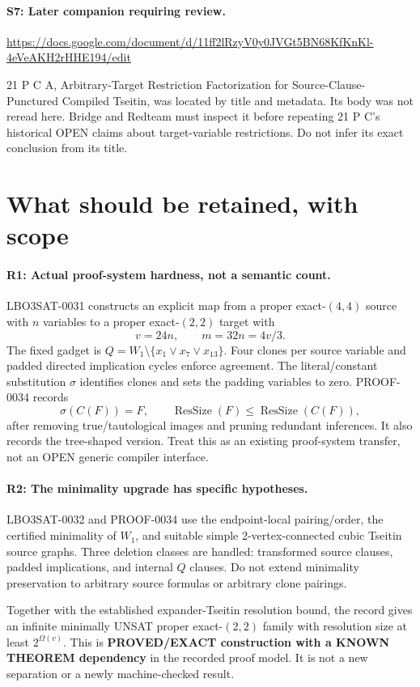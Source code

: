 \documentclass[11pt]{article}
\begin{document}
\paragraph{S7: Later companion requiring review.}
\url{https://docs.google.com/document/d/11ff2lRzyV0y0JVGt5BN68KfKnKl-4eVeAKH2rHHE194/edit}

21 P C A, Arbitrary-Target Restriction Factorization for Source-Clause-Punctured Compiled Tseitin, was located by title and metadata. Its body was not reread here. Bridge and Redteam must inspect it before repeating 21 P C's historical OPEN claims about target-variable restrictions. Do not infer its exact conclusion from its title.

\section{What should be retained, with scope}
\paragraph{R1: Actual proof-system hardness, not a semantic count.}
LBO3SAT-0031 constructs an explicit map from a proper exact-$(4,4)$ source with $n$ variables to a proper exact-$(2,2)$ target with
\[
 v=24n,\qquad m=32n=4v/3.
\]
The fixed gadget is $Q=W_1\setminus\{x_1\lor x_7\lor x_{13}\}$. Four clones per source variable and padded directed implication cycles enforce agreement. The literal/constant substitution $\sigma$ identifies clones and sets the padding variables to zero. PROOF-0034 records
\[
 \sigma(C(F))=F,\qquad
 \operatorname{ResSize}(F)\le\operatorname{ResSize}(C(F)),
\]
after removing true/tautological images and pruning redundant inferences. It also records the tree-shaped version. Treat this as an existing proof-system transfer, not an OPEN generic compiler interface.

\paragraph{R2: The minimality upgrade has specific hypotheses.}
LBO3SAT-0032 and PROOF-0034 use the endpoint-local pairing/order, the certified minimality of $W_1$, and suitable simple 2-vertex-connected cubic Tseitin source graphs. Three deletion classes are handled: transformed source clauses, padded implications, and internal $Q$ clauses. Do not extend minimality preservation to arbitrary source formulas or arbitrary clone pairings.

Together with the established expander-Tseitin resolution bound, the record gives an infinite minimally UNSAT proper exact-$(2,2)$ family with resolution size at least $2^{\Omega(v)}$. This is \textbf{PROVED/EXACT construction with a KNOWN THEOREM dependency} in the recorded proof model. It is not a new separation or a newly machine-checked result.
\end{document}
